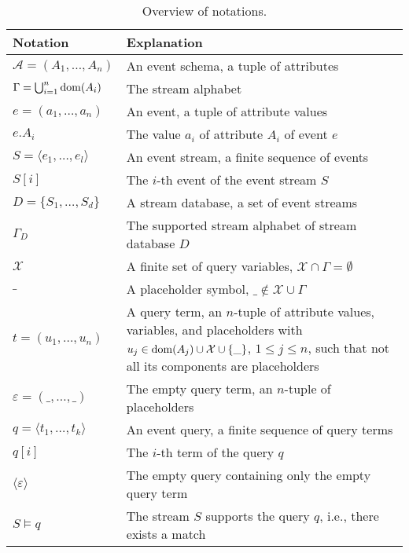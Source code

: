 \begin{table}[t]
	\caption{Overview of notations.}
	\label{tab:notations}
	\vspace{-1.1em}
	\footnotesize
	\begin{tabularx}{0.47\textwidth}{l
	@{\hspace{.5em}} p{5.8cm}}
	\toprule
	Notation & Explanation \\
	\midrule
	$\mathcal{A}=(A_1, \ldots, A_n )$ & An event
	schema, a
	tuple of attributes\\
	$\Gamma  = \bigcup_{i=1}^n{\operatorname{dom}(A_i)}$ & The stream alphabet\\
	$e= (a_1, \ldots, a_n)$ & An event, a tuple
	of attribute values\\
	$e.A_i$ & The value $a_i$ of attribute $A_i$ of
	event $e$\\
	$S=\langle e_1, \ldots, e_l \rangle$ & An event
	stream, a finite sequence of events\\
	$S[i]$ & The $i$-th event of the event stream $S$\\
	$D=\{S_1,\ldots, S_d \}$ & A stream database, a
	set of event streams\\
	$\Gamma_D$ & The supported stream alphabet of stream database $D$\\
	\midrule
	$\mathcal{X}$ & A finite set of query variables, $\mathcal{X} \cap
	\Gamma=\emptyset$\\
	$\_$ & A placeholder symbol, $\_ \notin \mathcal{X}\cup
	\Gamma$\\
	$t=(u_{1},\ldots,u_{n})$& A query term, an
	$n$-tuple of attribute values, variables, and placeholders with $u_{j}\in
	\operatorname{dom}(A_j) \cup \mathcal{X} \cup \{\_ \}$, $1\leq j\leq n$, such that not
	all its components are placeholders\\
	$\varepsilon=(\_,\ldots,\_)$& The empty query term, an
$n$-tuple of placeholders\\
	$q=\langle
	t_1, \ldots, t_k \rangle$ & An event query, a finite sequence of
	query terms \\
	$q[i]$ & The $i$-th term of the query $q$\\
	$\langle \varepsilon\rangle$ & The empty query containing only the empty
	query term \\
	\midrule
	$S \models q$ & The stream $S$ supports the
	query $q$, i.e., there exists a match\\
	
	\bottomrule
	\end{tabularx}
	\vspace{-1.5em}
\end{table}


